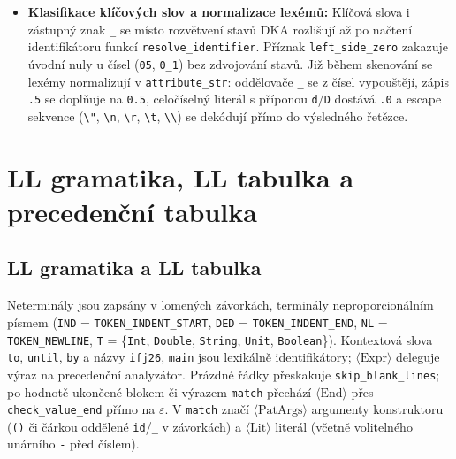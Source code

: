 \documentclass[11pt, a4paper]{article}
\begin{document}
\begin{itemize}[topsep=3pt, itemsep=3pt]
  \item \textbf{Klasifikace klíčových slov a normalizace lexémů:} Klíčová slova i zástupný znak \texttt{\_} se místo rozvětvení stavů DKA rozlišují až po načtení identifikátoru funkcí \texttt{resolve\_identifier}. Příznak \texttt{left\_side\_zero} zakazuje úvodní nuly u čísel (\texttt{05}, \texttt{0\_1}) bez zdvojování stavů. Již během skenování se lexémy normalizují v \texttt{attribute\_str}: oddělovače \texttt{\_} se z čísel vypouštějí, zápis \texttt{.5} se doplňuje na \texttt{0.5}, celočíselný literál s příponou \texttt{d}/\texttt{D} dostává \texttt{.0} a escape sekvence (\texttt{\textbackslash"}, \texttt{\textbackslash n}, \texttt{\textbackslash r}, \texttt{\textbackslash t}, \texttt{\textbackslash\textbackslash}) se dekódují přímo do výsledného řetězce.
\end{itemize}
\newpage
\section{LL gramatika, LL tabulka a precedenční tabulka}

\subsection{LL gramatika a LL tabulka}
Neterminály jsou zapsány v lomených závorkách, terminály neproporcionálním písmem (\texttt{IND} = \texttt{TOKEN\_INDENT\_START}, \texttt{DED} = \texttt{TOKEN\_INDENT\_END}, \texttt{NL} = \texttt{TOKEN\_NEWLINE}, \texttt{T} = \{\texttt{Int}, \texttt{Double}, \texttt{String}, \texttt{Unit}, \texttt{Boolean}\}). Kontextová slova \texttt{to}, \texttt{until}, \texttt{by} a názvy \texttt{ifj26}, \texttt{main} jsou lexikálně identifikátory; $\langle\text{Expr}\rangle$ deleguje výraz na precedenční analyzátor. Prázdné řádky přeskakuje \texttt{skip\_blank\_lines}; po hodnotě ukončené blokem či výrazem \texttt{match} přechází $\langle\text{End}\rangle$ přes \texttt{check\_value\_end} přímo na $\varepsilon$. V \texttt{match} značí $\langle\text{PatArgs}\rangle$ argumenty konstruktoru (\texttt{()} či čárkou oddělené \texttt{id}/\texttt{\_} v závorkách) a $\langle\text{Lit}\rangle$ literál (včetně volitelného unárního \texttt{-} před číslem).
\end{document}
